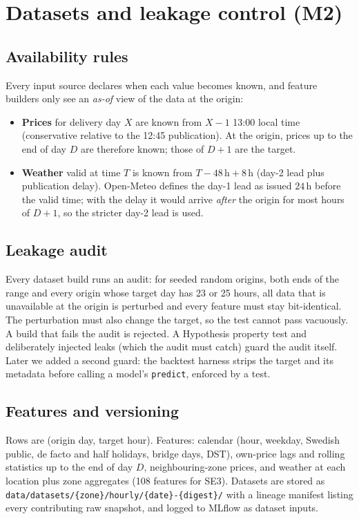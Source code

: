\documentclass[11pt,a4paper]{article}
\newcommand{\code}[1]{\texttt{#1}}
\begin{document}
\section{Datasets and leakage control (M2)}

\subsection{Availability rules}
Every input source declares when each value becomes known, and feature builders only see an
\emph{as-of} view of the data at the origin:
\begin{itemize}
\item \textbf{Prices} for delivery day $X$ are known from $X{-}1$ 13:00 local time (conservative
relative to the 12:45 publication). At the origin, prices up to the end of day $D$ are therefore
known; those of $D{+}1$ are the target.
\item \textbf{Weather} valid at time $T$ is known from $T - 48\,\mathrm{h} + 8\,\mathrm{h}$
(day-2 lead plus publication delay). Open-Meteo defines the day-1 lead as issued $24$\,h before
the valid time; with the delay it would arrive \emph{after} the origin for most hours of $D{+}1$,
so the stricter day-2 lead is used.
\end{itemize}

\subsection{Leakage audit}
Every dataset build runs an audit: for seeded random origins, both ends of the range and every
origin whose target day has 23 or 25 hours, all data that is unavailable at the origin is
perturbed and every feature must stay bit-identical. The perturbation must also change the target,
so the test cannot pass vacuously. A build that fails the audit is rejected. A Hypothesis property
test and deliberately injected leaks (which the audit must catch) guard the audit itself. Later we
added a second guard: the backtest harness strips the target and its metadata before calling a
model's \code{predict}, enforced by a test.

\subsection{Features and versioning}
Rows are (origin day, target hour). Features: calendar (hour, weekday, Swedish public, de facto
and half holidays, bridge days, DST), own-price lags and rolling statistics up to the end of day
$D$, neighbouring-zone prices, and weather at each location plus zone aggregates (108 features for
SE3). Datasets are stored as
\code{data/datasets/\{zone\}/hourly/\{date\}-\{digest\}/} with a lineage manifest listing every
contributing raw snapshot, and logged to MLflow as dataset inputs.
\end{document}
